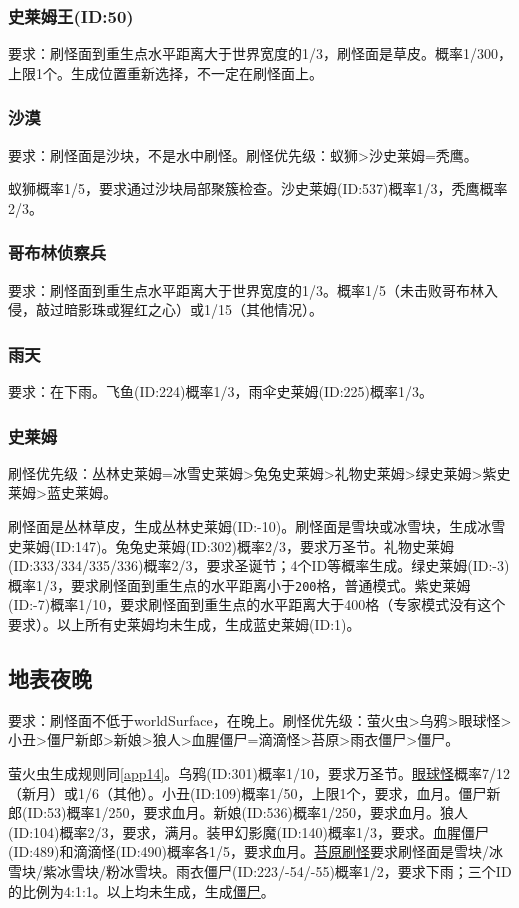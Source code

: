\subsubsection{史莱姆王(ID:50)}
要求：刷怪面到重生点水平距离大于世界宽度的1/3，刷怪面是草皮。概率1/300，上限1个。生成位置重新选择，不一定在刷怪面上。

\subsubsection{沙漠}
要求：刷怪面是沙块，不是水中刷怪。刷怪优先级：蚁狮>沙史莱姆=秃鹰。

蚁狮概率1/5，要求通过沙块局部聚簇检查。沙史莱姆(ID:537)概率1/3，秃鹰概率2/3。

\subsubsection{哥布林侦察兵}
要求：刷怪面到重生点水平距离大于世界宽度的1/3。概率1/5（未击败哥布林入侵，敲过暗影珠或猩红之心）或1/15（其他情况）。

\subsubsection{雨天}
要求：在下雨。飞鱼(ID:224)概率1/3，雨伞史莱姆(ID:225)概率1/3。

\subsubsection{史莱姆}
刷怪优先级：丛林史莱姆=冰雪史莱姆>兔兔史莱姆>礼物史莱姆>绿史莱姆>紫史莱姆>蓝史莱姆。

刷怪面是丛林草皮，生成丛林史莱姆(ID:-10)。刷怪面是雪块或冰雪块，生成冰雪史莱姆(ID:147)。兔兔史莱姆(ID:302)概率2/3，要求万圣节。礼物史莱姆(ID:333/334/335/336)概率2/3，要求圣诞节；4个ID等概率生成。绿史莱姆(ID:-3)概率1/3，要求刷怪面到重生点的水平距离小于\lstinline{200}格，普通模式。紫史莱姆(ID:-7)概率1/10，要求刷怪面到重生点的水平距离大于400格（专家模式没有这个要求）。以上所有史莱姆均未生成，生成蓝史莱姆(ID:1)。

\subsection{地表夜晚}
要求：刷怪面不低于worldSurface，在晚上。刷怪优先级：萤火虫>乌鸦>眼球怪>小丑>僵尸新郎>新娘>狼人>血腥僵尸=滴滴怪>苔原>雨衣僵尸>僵尸。

萤火虫生成规则同\autoref{app14}。乌鸦(ID:301)概率1/10，要求万圣节。\hyperref[app15]{眼球怪}概率7/12（新月）或1/6（其他）。小丑(ID:109)概率1/50，上限1个，要求，血月。僵尸新郎(ID:53)概率1/250，要求血月。新娘(ID:536)概率1/250，要求血月。狼人(ID:104)概率2/3，要求，满月。装甲幻影魔(ID:140)概率1/3，要求。血腥僵尸(ID:489)和滴滴怪(ID:490)概率各1/5，要求血月。\hyperref[app16]{苔原刷怪}要求刷怪面是雪块/冰雪块/紫冰雪块/粉冰雪块。雨衣僵尸(ID:223/-54/-55)概率1/2，要求下雨；三个ID的比例为4:1:1。以上均未生成，生成\hyperref[app17]{僵尸}。

